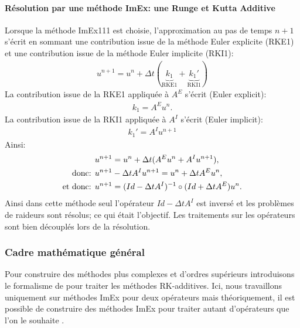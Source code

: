     \paragraph{Résolution par une méthode ImEx: une Runge et Kutta Additive}
            Lorsque la méthode ImEx111 est choisie,
            l’approximation au pas de temps $n+1$ s'écrit en sommant une contribution issue de la méthode Euler explicite (RKE1)
            et une contribution issue de la méthode Euler implicite (RKI1):
            \begin{align}
                u^{n+1} = u^n + \Delta t (\underbrace{k_1}_{\text{RKE1}} + \underbrace{k_1'}_{\text{RKI1}})
            \end{align}
            La contribution issue de la RKE1 appliquée à $A^E$ s'écrit (Euler explicit):
            \begin{align}
                k_1 = A^E u^n.
            \end{align}
            La contribution issue de la RKI1 appliquée à $A^I$ s'écrit (Euler implicit):
            \begin{align}
                k_1' = A^I u^{n+1}
            \end{align}
            Ainsi: 
            \begin{align}
                &u^{n+1} = u^n + \Delta t ( A^E u^n +  A^I u^{n+1}),\\\notag
                \text{donc: }&u^{n+1} - \Delta t  A^I u^{n+1} = u^n + \Delta t  A^E u^n,\\\notag
                \text{et donc: }&u^{n+1} = (Id - \Delta t A^I)^{-1} \circ (Id + \Delta t A^E) u^n.
            \end{align}
            Ainsi dans cette méthode seul l’opérateur $Id- \Delta t A^I$ est inversé et les problèmes de raideurs sont résolus;
            ce qui était l’objectif. Les traitements sur les opérateurs sont bien découplés lors de la résolution.
\subsubsection{Cadre mathématique général}
    Pour construire des méthodes plus complexes et d'ordres supérieurs introduisons le formalisme de \cite{ASCHER1997151} pour traiter les méthodes RK-additives. 
    Ici, nous travaillons uniquement sur méthodes ImEx pour deux opérateurs mais théoriquement, il est possible de construire des méthodes ImEx pour traiter 
    autant d'opérateurs que l'on le souhaite \cite{KENNEDY2003139}.
